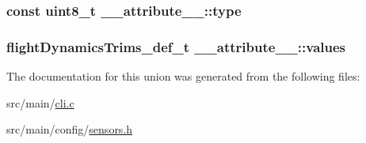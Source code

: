 \hypertarget{struct____attribute_____a75c7081d1b709703f2844b6d005d12a9}{
\subsubsection[{type}]{\setlength{\rightskip}{0pt plus 5cm}const uint8\+\_\+t \+\_\+\+\_\+attribute\+\_\+\+\_\+\+::type}}\label{struct____attribute_____a75c7081d1b709703f2844b6d005d12a9}
\hypertarget{struct____attribute_____aeb21b2e8797e36156135a1ca01f284de}{
\subsubsection[{values}]{\setlength{\rightskip}{0pt plus 5cm}flight\+Dynamics\+Trims\+\_\+def\+\_\+t \+\_\+\+\_\+attribute\+\_\+\+\_\+\+::values}}\label{struct____attribute_____aeb21b2e8797e36156135a1ca01f284de}


The documentation for this union was generated from the following files\+:\begin{DoxyCompactItemize}
\item 
src/main/\hyperlink{cli_8c}{cli.\+c}\item 
src/main/config/\hyperlink{sensors_8h}{sensors.\+h}\end{DoxyCompactItemize}
